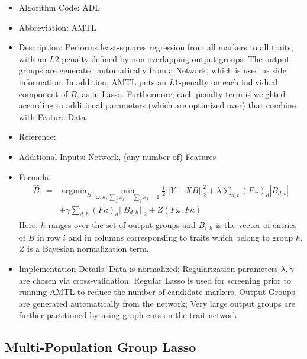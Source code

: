 \documentclass{article}
\newcommand{\argmin}{\operatorname{argmin}}
\begin{document}
\begin{itemize}
\item Algorithm Code: ADL
\item Abbreviation: AMTL
\item Description: Performs least-squares regression from all markers to all traits, with an $L2$-penalty defined by non-overlapping output groups. The output groups are generated automatically from a Network, which is used as side information. In addition, AMTL puts an $L1$-penalty on each individual component of $B$, as in Lasso. Furthermore, each penalty term is weighted according to additional parameters (which are optimized over) that combine with Feature Data.
\item Reference: \cite{TreeLasso}
\item Additional Inputs: Network, (any number of) Features
\item Formula:
\begin{eqnarray*}
\hat{B} &=& \argmin_{B} \min_{\omega, \kappa, \sum_f \omega_f = \sum_f \kappa_f = 1} \frac{1}{2}||Y - XB||_2^2 + \lambda \sum_{d,t}(F\omega)_d|B_{d,t}|\\
&& + \gamma \sum_{d,h}(F\kappa)_d||B_{d,h}||_2 + Z(F\omega, F\kappa)
\end{eqnarray*}
Here, $h$ ranges over the set of output groups and $B_{i,h}$ is the vector of entries of $B$ in row $i$ and in columns corresponding to traits which belong to group $h$. $Z$ is a Bayesian normalization term.
\item Implementation Details: Data is normalized; Regularization parameters $\lambda, \gamma$ are chosen via cross-validation; Regular Lasso is used for screening prior to running AMTL to reduce the number of candidate markers; Output Groups are generated automatically from the network; Very large output groups are further partitioned by using graph cuts on the trait network
\end{itemize}

\subsection{Multi-Population Group Lasso}
\end{document}
